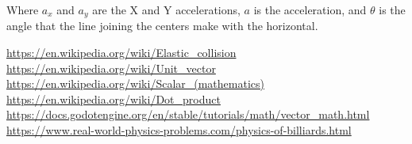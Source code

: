 \documentclass{amsart}
\begin{document}
Where $a_x$ and $a_y$ are the X and Y accelerations, $a$ is the acceleration,
and $\theta$ is the angle that the line joining the centers make with the
horizontal.

\newpage

\begin{thebibliography}{9}
  \url{https://en.wikipedia.org/wiki/Elastic_collision}
  \url{https://en.wikipedia.org/wiki/Unit_vector}
  \url{https://en.wikipedia.org/wiki/Scalar_(mathematics)}
  \url{https://en.wikipedia.org/wiki/Dot_product}
  \url{https://docs.godotengine.org/en/stable/tutorials/math/vector_math.html}
  \url{https://www.real-world-physics-problems.com/physics-of-billiards.html}
\end{thebibliography}
\end{document}

